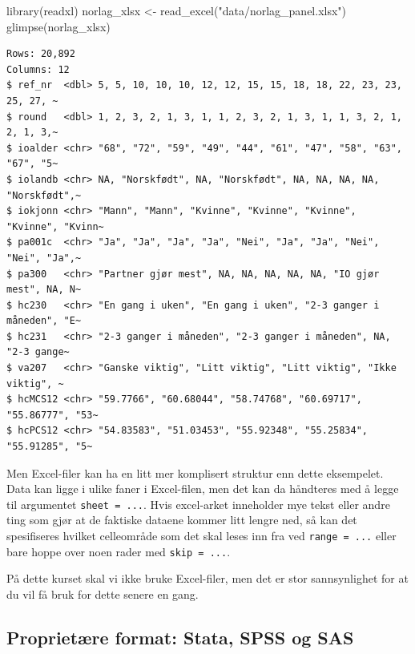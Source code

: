 \documentclass[
  letterpaper,
  DIV=11,
  numbers=noendperiod]{scrreprt}
\newenvironment{Shaded}{\begin{snugshade}}{\end{snugshade}}
\newcommand{\FunctionTok}[1]{\textcolor[rgb]{0.28,0.35,0.67}{#1}}
\newcommand{\NormalTok}[1]{\textcolor[rgb]{0.00,0.23,0.31}{#1}}
\newcommand{\OtherTok}[1]{\textcolor[rgb]{0.00,0.23,0.31}{#1}}
\newcommand{\StringTok}[1]{\textcolor[rgb]{0.13,0.47,0.30}{#1}}
\theoremstyle{definition}
\theoremstyle{remark}
\begin{document}
\begin{Shaded}
\begin{Highlighting}[]
\FunctionTok{library}\NormalTok{(readxl)}
\NormalTok{norlag\_xlsx }\OtherTok{\textless{}{-}} \FunctionTok{read\_excel}\NormalTok{(}\StringTok{"data/norlag\_panel.xlsx"}\NormalTok{)}
\FunctionTok{glimpse}\NormalTok{(norlag\_xlsx)}
\end{Highlighting}
\end{Shaded}

\begin{verbatim}
Rows: 20,892
Columns: 12
$ ref_nr  <dbl> 5, 5, 10, 10, 10, 12, 12, 15, 15, 18, 18, 22, 23, 23, 25, 27, ~
$ round   <dbl> 1, 2, 3, 2, 1, 3, 1, 1, 2, 3, 2, 1, 3, 1, 1, 3, 2, 1, 2, 1, 3,~
$ ioalder <chr> "68", "72", "59", "49", "44", "61", "47", "58", "63", "67", "5~
$ iolandb <chr> NA, "Norskfødt", NA, "Norskfødt", NA, NA, NA, NA, "Norskfødt",~
$ iokjonn <chr> "Mann", "Mann", "Kvinne", "Kvinne", "Kvinne", "Kvinne", "Kvinn~
$ pa001c  <chr> "Ja", "Ja", "Ja", "Ja", "Nei", "Ja", "Ja", "Nei", "Nei", "Ja",~
$ pa300   <chr> "Partner gjør mest", NA, NA, NA, NA, NA, "IO gjør mest", NA, N~
$ hc230   <chr> "En gang i uken", "En gang i uken", "2-3 ganger i måneden", "E~
$ hc231   <chr> "2-3 ganger i måneden", "2-3 ganger i måneden", NA, "2-3 gange~
$ va207   <chr> "Ganske viktig", "Litt viktig", "Litt viktig", "Ikke viktig", ~
$ hcMCS12 <chr> "59.7766", "60.68044", "58.74768", "60.69717", "55.86777", "53~
$ hcPCS12 <chr> "54.83583", "51.03453", "55.92348", "55.25834", "55.91285", "5~
\end{verbatim}

Men Excel-filer kan ha en litt mer komplisert struktur enn dette
eksempelet. Data kan ligge i ulike faner i Excel-filen, men det kan da
håndteres med å legge til argumentet \texttt{sheet\ =\ ...}. Hvis
excel-arket inneholder mye tekst eller andre ting som gjør at de
faktiske dataene kommer litt lengre ned, så kan det spesifiseres hvilket
celleområde som det skal leses inn fra ved \texttt{range\ =\ ...} eller
bare hoppe over noen rader med \texttt{skip\ =\ ...}.

På dette kurset skal vi ikke bruke Excel-filer, men det er stor
sannsynlighet for at du vil få bruk for dette senere en gang.

\hypertarget{proprietuxe6re-format-stata-spss-og-sas}{%
\subsection{Proprietære format: Stata, SPSS og
SAS}\label{proprietuxe6re-format-stata-spss-og-sas}}
\end{document}
